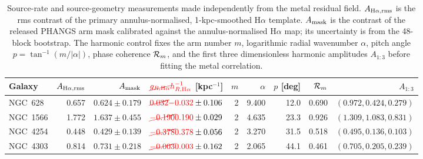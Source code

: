 \documentclass[fleqn,usenatbib]{mnras}
\newcommand{\revaddmath}[1]{\textcolor{red}{#1}}
\newcommand{\revdelmath}[1]{\textcolor{red}{\cancel{#1}}}
\begin{document}
\begin{table}
\centering
\scriptsize
\setlength{\tabcolsep}{3.6pt}
\caption{Source-rate and source-geometry measurements made independently from the metal residual field.  $A_{{\rm H}\alpha,{\rm rms}}$ is the rms contrast of the primary annulus-normalised, 1-kpc-smoothed H$\alpha$ template.  $A_{\rm mask}$ is the contrast of the released PHANGS arm mask calibrated against the annulus-normalised H$\alpha$ map; its uncertainty is from the 48-block bootstrap.  The harmonic control fixes the arm number $m$, logarithmic radial wavenumber $\alpha$, pitch angle $p=\tan^{-1}(m/|\alpha|)$, phase coherence ${\cal R}_m$, and the first three dimensionless harmonic amplitudes $A_{1:3}$ before fitting the metal correlation.}
\label{tab:phangs_spirals}
\begin{tabular}{@{}lrrrrrrrr@{}}
\toprule
Galaxy & $A_{{\rm H}\alpha,{\rm rms}}$ & $A_{\rm mask}$ & $\revdelmath{g_{R,\mathrm{H}\alpha}}\revaddmath{h_{R,{\rm H}\alpha}^{-1}}$ [kpc$^{-1}$] & $m$ & $\alpha$ & $p$ [deg] & ${\cal R}_m$ & $A_{1:3}$\\
\midrule
NGC~628  & 0.657 & $0.624\pm0.179$ & $\revdelmath{0.032}\revaddmath{-0.032}\pm0.106$ & 2 & 9.400 & 12.0 & 0.690 & $(0.972,0.424,0.279)$\\
NGC~1566 & 1.772 & $1.637\pm0.455$ & $\revdelmath{-0.190}\revaddmath{0.190}\pm0.029$ & 2 & 4.635 & 23.3 & 0.926 & $(1.309,1.083,0.831)$\\
NGC~4254 & 0.448 & $0.429\pm0.139$ & $\revdelmath{-0.378}\revaddmath{0.378}\pm0.056$ & 2 & 3.270 & 31.5 & 0.518 & $(0.495,0.136,0.103)$\\
NGC~4303 & 0.814 & $0.731\pm0.218$ & $\revdelmath{-0.003}\revaddmath{0.003}\pm0.162$ & 2 & 2.065 & 44.1 & 0.461 & $(0.705,0.205,0.239)$\\
\bottomrule
\end{tabular}
\end{table}
\end{document}

